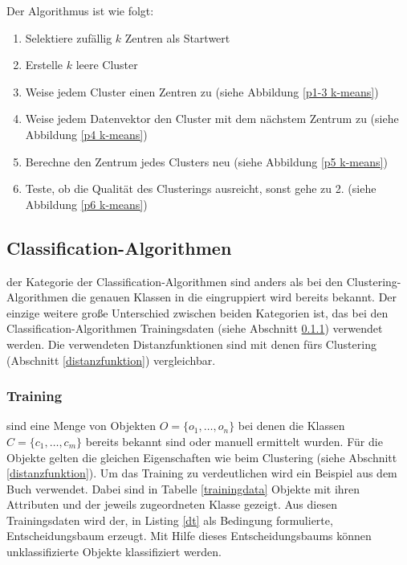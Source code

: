 \documentclass[12pt,journal,compsoc]{IEEEtran}
\begin{document}
Der Algorithmus ist wie folgt:
\begin{enumerate}
\item Selektiere zufällig $k$ Zentren als Startwert
\item Erstelle $k$ leere Cluster
\item Weise jedem Cluster einen Zentren zu (siehe Abbildung \ref{p1-3 k-means})
\item Weise jedem Datenvektor den Cluster mit dem nächstem Zentrum zu (siehe Abbildung \ref{p4 k-means})
\item Berechne den Zentrum jedes Clusters neu (siehe Abbildung \ref{p5 k-means})
\item Teste, ob die Qualität des Clusterings ausreicht, sonst gehe zu 2. (siehe Abbildung \ref{p6 k-means})
\end{enumerate}


 \subsection{Classification-Algorithmen}
  der Kategorie der Classification-Algorithmen sind anders 
 als bei den Clustering-Algorithmen die genauen Klassen in die 
 eingruppiert wird bereits bekannt. Der einzige weitere große 
 Unterschied zwischen beiden Kategorien ist, das bei den 
 Classification-Algorithmen Trainingsdaten (siehe Abschnitt \ref{training}) verwendet werden. 
 Die verwendeten Distanzfunktionen sind mit denen fürs Clustering (Abschnitt \ref{distanzfunktion}) vergleichbar.
 
 \subsubsection{Training}\label{training}
  sind eine Menge von Objekten $O = \{o_1, \ldots, o_n\}$
 bei denen die Klassen $C = \{c_1, \ldots, c_m\}$ bereits bekannt sind oder manuell 
 ermittelt wurden. Für die Objekte gelten die gleichen Eigenschaften wie beim Clustering 
 (siehe Abschnitt \ref{distanzfunktion}). Um das Training zu verdeutlichen wird ein Beispiel 
 aus dem Buch \cite{ester2000knowledge} verwendet. Dabei sind in Tabelle 
 \ref{trainingdata} Objekte mit ihren Attributen und der jeweils zugeordneten Klasse gezeigt. 
 Aus diesen Trainingsdaten wird der, in Listing \ref{dt} als Bedingung formulierte, Entscheidungsbaum
 erzeugt. Mit Hilfe dieses Entscheidungsbaums können unklassifizierte Objekte klassifiziert werden. 
\end{document}

